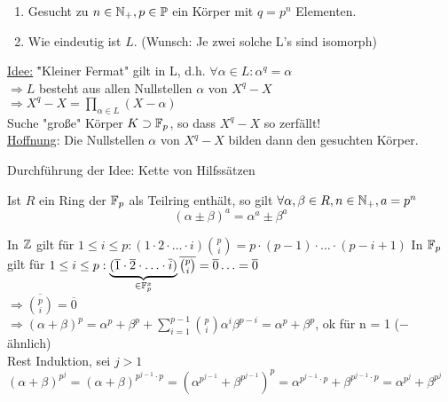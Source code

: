 \documentclass[a4paper,DIV15,BCOR12mm]{article}
\begin{document}
\begin{enumerate}
\item Gesucht zu $n \in \mathbb{N}_+,p \in \mathbb{P}$ ein Körper mit $q=p^n$ Elementen.
\item Wie eindeutig ist $L$. (Wunsch: Je zwei solche L's sind isomorph)
\end{enumerate}
\begin{tabbing}
\underline{Idee:} \= "Kleiner Fermat" gilt in L, d.h. $\forall \alpha \in L: \alpha^q = \alpha$ \\
\> $\Rightarrow L$ besteht aus allen Nullstellen $\alpha$ von $X^q-X$ \\
\> $\Rightarrow X^q-X=\prod_{\alpha \in L}(X-\alpha)$ \\
\> Suche "große" Körper $K \supset \mathbb{F}_p$, so dass $X^q-X$ so zerfällt! \\
\> \underline{Hoffnung}: Die Nullstellen $\alpha$ von $X^q-X$ bilden dann den gesuchten Körper.
\end{tabbing}

Durchführung der Idee: Kette von Hilfssätzen
\begin{hilfssatz}[1]
Ist $R$ ein Ring der $\mathbb{F}_p$ als Teilring enthält, so gilt $\forall \alpha,\beta \in R,n\in \mathbb{N}_+,a=p^n$
$$(\alpha \pm \beta)^a = \alpha^a \pm \beta^a$$
\end{hilfssatz}
\begin{beweis}
In $\mathbb{Z}$ gilt für $1 \leq i \leq p: (1 \cdot 2 \cdot \dotsc \cdot i){p \choose i} = p \cdot (p-1) \cdot \dotsc \cdot (p-i+1)$
In $\mathbb{F}_p$ gilt für $1 \leq i \leq p: \underbrace{(\overline 1 \cdot \overline 2 \cdot \dotsc \cdot \overline i)}_{\in \mathbb{F}_p^x}\overline{{p \choose i}} = \overline 0 \dotsc = \overline 0$ \\
$\Rightarrow \overline{{p \choose i}} = \overline 0$\\
$\Rightarrow (\alpha + \beta)^p = \alpha^p + \beta^p + \sum_{i=1}^{p-1}{p \choose i} \alpha^i\beta^{p-i} = \alpha^p + \beta^p$, ok für n = 1 ($-$ ähnlich)\\
Rest Induktion, sei $j > 1$\\
$(\alpha + \beta)^{p^j} = (\alpha + \beta)^{p^{j-1} \cdot p} = (\alpha^{p^{j-1}} + \beta^{p^{j-1}})^p = \alpha^{p^{j-1} \cdot p} + \beta^{p^{j-1} \cdot p} = \alpha^{p^j} + \beta^{p^j}$
\end{beweis}
\end{document}
